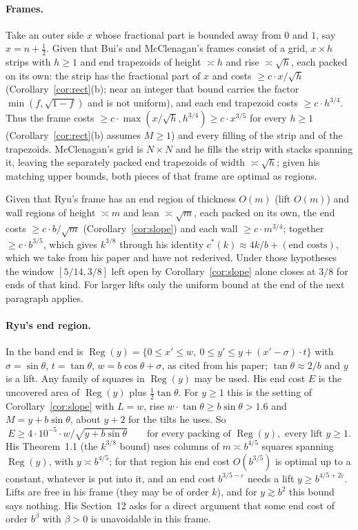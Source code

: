 \documentclass[11pt,letterpaper]{amsart}
\theoremstyle{plain}
\theoremstyle{definition}
\theoremstyle{remark}
\newcommand{\cs}{c^{*}}
\begin{document}
\paragraph{Frames.}
Take an outer side $x$ whose fractional part is bounded away from $0$ and $1$, say $x=n+\tfrac12$. Given that Bui's and McClenagan's frames consist of a grid, $x\times h$ strips with $h\ge1$ and end trapezoids of height $\asymp h$ and rise $\asymp\sqrt h$, each packed on its own: the strip has the fractional part of $x$ and costs $\ge c\cdot x/\sqrt h$ (Corollary~\ref{cor:rect}(b); near an integer that bound carries the factor $\min(f,\sqrt{1-f})$ and is not uniform), and each end trapezoid costs $\ge c\cdot h^{3/4}$. Thus the frame costs $\ge c\cdot\max(x/\sqrt h,h^{3/4})\ge c\cdot x^{3/5}$ for every $h\ge1$ (Corollary~\ref{cor:rect}(b) assumes $M\ge1$) and every filling of the strip and of the trapezoids. McClenagan's grid is $N\times N$ and he fills the strip with stacks spanning it, leaving the separately packed end trapezoids of width $\asymp\sqrt h$; given his matching upper bounds, both pieces of that frame are optimal as regions.

Given that Ryu's frame has an end region of thickness $O(m)$ (lift $O(m)$) and wall regions of height $\asymp m$ and lean $\asymp\sqrt m$, each packed on its own, the end costs $\ge c\cdot b/\sqrt m$ (Corollary~\ref{cor:slope}) and each wall $\ge c\cdot m^{3/4}$; together $\ge c\cdot b^{3/5}$, which gives $k^{3/8}$ through his identity $\cs(k)\approx4k/b+(\text{end costs})$, which we take from his paper and have not rederived. Under those hypotheses the window $[5/14,3/8]$ left open by Corollary~\ref{cor:slope} alone closes at $3/8$ for ends of that kind. For larger lifts only the uniform bound at the end of the next paragraph applies.

\paragraph{Ryu's end region.}
In \cite{Ryu26} the band end is $\operatorname{Reg}(y)=\{0\le x'\le w,\ 0\le y'\le y+(x'-\sigma)\cdot t\}$ with $\sigma=\sin\theta$, $t=\tan\theta$, $w=b\cos\theta+\sigma$, as cited from his paper; $\tan\theta\approx2/b$ and $y$ is a lift. Any family of squares in $\operatorname{Reg}(y)$ may be used. His end cost $E$ is the uncovered area of $\operatorname{Reg}(y)$ plus $\tfrac12\tan\theta$. For $y\ge1$ this is the setting of Corollary~\ref{cor:slope} with $L=w$, rise $w\cdot\tan\theta\ge b\sin\theta>1.6$ and $M=y+b\sin\theta$, about $y+2$ for the tilts he uses. So
\[
E\ge4\cdot10^{-5}\cdot w/\sqrt{y+b\sin\theta}\qquad\text{for every packing of }\operatorname{Reg}(y),\text{ every lift }y\ge1.
\]
His Theorem~1.1 (the $k^{3/8}$ bound) uses columns of $m\asymp b^{4/5}$ squares spanning $\operatorname{Reg}(y)$, with $y\asymp b^{4/5}$; for that region his end cost $O(b^{3/5})$ is optimal up to a constant, whatever is put into it, and an end cost $b^{3/5-\varepsilon}$ needs a lift $y\ge b^{4/5+2\varepsilon}$. Lifts are free in his frame (they may be of order $k$), and for $y\gtrsim b^2$ this bound says nothing. His Section~12 asks for a direct argument that some end cost of order $b^\beta$ with $\beta>0$ is unavoidable in this frame.
\end{document}
